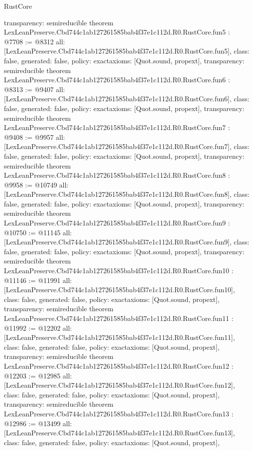 \begin{lexlean}{RustCore}
\begin{coremodule}
{  transparency: semireducible
}
theorem LexLeanPreserve.Cbd744c1ab127261585bab4f37e1c112d.R0.RustCore.fun5 : @7708 := @8312 {
  all: [LexLeanPreserve.Cbd744c1ab127261585bab4f37e1c112d.R0.RustCore.fun5],
  class: false,
  generated: false,
  policy: exact{axioms: [Quot.sound, propext]},
  transparency: semireducible
}
theorem LexLeanPreserve.Cbd744c1ab127261585bab4f37e1c112d.R0.RustCore.fun6 : @8313 := @9407 {
  all: [LexLeanPreserve.Cbd744c1ab127261585bab4f37e1c112d.R0.RustCore.fun6],
  class: false,
  generated: false,
  policy: exact{axioms: [Quot.sound, propext]},
  transparency: semireducible
}
theorem LexLeanPreserve.Cbd744c1ab127261585bab4f37e1c112d.R0.RustCore.fun7 : @9408 := @9957 {
  all: [LexLeanPreserve.Cbd744c1ab127261585bab4f37e1c112d.R0.RustCore.fun7],
  class: false,
  generated: false,
  policy: exact{axioms: [Quot.sound, propext]},
  transparency: semireducible
}
theorem LexLeanPreserve.Cbd744c1ab127261585bab4f37e1c112d.R0.RustCore.fun8 : @9958 := @10749 {
  all: [LexLeanPreserve.Cbd744c1ab127261585bab4f37e1c112d.R0.RustCore.fun8],
  class: false,
  generated: false,
  policy: exact{axioms: [Quot.sound, propext]},
  transparency: semireducible
}
theorem LexLeanPreserve.Cbd744c1ab127261585bab4f37e1c112d.R0.RustCore.fun9 : @10750 := @11145 {
  all: [LexLeanPreserve.Cbd744c1ab127261585bab4f37e1c112d.R0.RustCore.fun9],
  class: false,
  generated: false,
  policy: exact{axioms: [Quot.sound, propext]},
  transparency: semireducible
}
theorem LexLeanPreserve.Cbd744c1ab127261585bab4f37e1c112d.R0.RustCore.fun10 : @11146 := @11991 {
  all: [LexLeanPreserve.Cbd744c1ab127261585bab4f37e1c112d.R0.RustCore.fun10],
  class: false,
  generated: false,
  policy: exact{axioms: [Quot.sound, propext]},
  transparency: semireducible
}
theorem LexLeanPreserve.Cbd744c1ab127261585bab4f37e1c112d.R0.RustCore.fun11 : @11992 := @12202 {
  all: [LexLeanPreserve.Cbd744c1ab127261585bab4f37e1c112d.R0.RustCore.fun11],
  class: false,
  generated: false,
  policy: exact{axioms: [Quot.sound, propext]},
  transparency: semireducible
}
theorem LexLeanPreserve.Cbd744c1ab127261585bab4f37e1c112d.R0.RustCore.fun12 : @12203 := @12985 {
  all: [LexLeanPreserve.Cbd744c1ab127261585bab4f37e1c112d.R0.RustCore.fun12],
  class: false,
  generated: false,
  policy: exact{axioms: [Quot.sound, propext]},
  transparency: semireducible
}
theorem LexLeanPreserve.Cbd744c1ab127261585bab4f37e1c112d.R0.RustCore.fun13 : @12986 := @13499 {
  all: [LexLeanPreserve.Cbd744c1ab127261585bab4f37e1c112d.R0.RustCore.fun13],
  class: false,
  generated: false,
  policy: exact{axioms: [Quot.sound, propext]},
}
\end{coremodule}
\end{lexlean}
